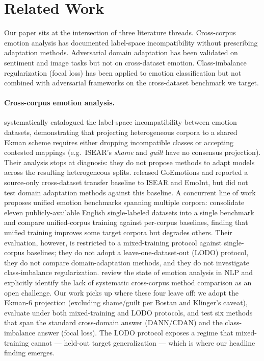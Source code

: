\section{Related Work}
\label{sec:related}

Our paper sits at the intersection of three literature threads.
Cross-corpus emotion analysis has documented label-space
incompatibility without prescribing adaptation methods.
Adversarial domain adaptation has been validated on sentiment and
image tasks but not on cross-dataset emotion.
Class-imbalance regularization (focal loss) has been applied to
emotion classification but not combined with adversarial frameworks
on the cross-dataset benchmark we target.

\paragraph{Cross-corpus emotion analysis.}
\citet{bostan2018analysis} systematically catalogued the label-space
incompatibility between emotion datasets, demonstrating that
projecting heterogeneous corpora to a shared Ekman scheme requires
either dropping incompatible classes or accepting contested mappings
(e.g.\ ISEAR's \emph{shame} and \emph{guilt} have no consensus
projection). Their analysis stops at diagnosis: they do not propose
methods to adapt models across the resulting heterogeneous splits.
\citet{demszky2020goemotions} released GoEmotions and reported a
source-only cross-dataset transfer baseline to ISEAR and EmoInt, but
did not test domain adaptation methods against this baseline.
A concurrent line of work proposes unified emotion benchmarks
spanning multiple corpora: \citet{koufakou2024towards} consolidate
eleven publicly-available English single-labeled datasets into a
single benchmark and compare unified-corpus training against
per-corpus baselines, finding that unified training improves some
target corpora but degrades others. Their evaluation, however, is
restricted to a mixed-training protocol against single-corpus
baselines; they do not adopt a leave-one-dataset-out (LODO)
protocol, they do not compare domain-adaptation methods, and they do
not investigate class-imbalance regularization. \citet{plaza2024emotion}
review the state of emotion analysis in NLP and explicitly identify
the lack of systematic cross-corpus method comparison as an open
challenge.
Our work picks up where these four leave off: we adopt the Ekman-6
projection (excluding shame/guilt per Bostan and Klinger's
caveat), evaluate under both mixed-training and LODO protocols, and
test six methods that span the standard cross-domain answer
(DANN/CDAN) and the class-imbalance answer (focal loss). The LODO
protocol exposes a regime that mixed-training cannot — held-out target
generalization — which is where our headline finding emerges.


